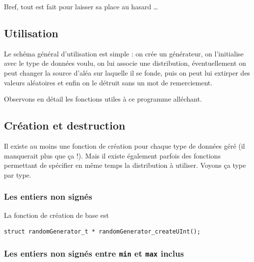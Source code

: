    Bref, tout est fait pour laisser sa place au hasard \ldots


%
\subsection{Utilisation}

   Le schéma général d'utilisation est simple : on crée un générateur,
on l'initialise avec le type de données voulu, on lui associe une
distribution, éventuellement on peut changer la source d'aléa sur
laquelle il se fonde, puis on peut lui extirper des valeurs aléatoires
et enfin on le détruit sans un mot de remerciement.

   Observons en détail les fonctions utiles à ce programme alléchant.

%
\subsection{Création et destruction}

   Il existe au moins une fonction de création pour chaque type de
données géré (il manquerait plus que ça !). Mais il existe également
parfois des fonctions permettant de spécifier en même temps la
distribution à utiliser. Voyons ça type par type.

%
\subsubsection{Les entiers non signés}

   La fonction de création de base est 

\begin{verbatim}
struct randomGenerator_t * randomGenerator_createUInt();
\end{verbatim}

%
\subsubsection{Les entiers non signés entre {\tt min} et {\tt max} inclus}


